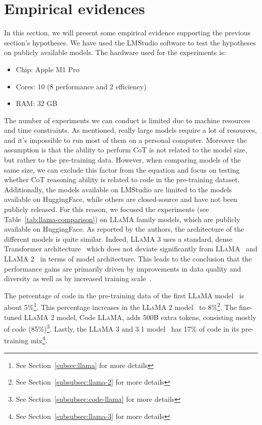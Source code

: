 \section{Empirical evidences}
\label{sec:empirical-evidence}

In this section, we will present some empirical evidence supporting the previous section's hypotheses.
We have used the LMStudio\cite{lmstudio} software to test the hypotheses on publicly available models.
The hardware used for the experiments is:
\begin{itemize}
	\item Chip: Apple M1 Pro
	\item Cores: 10 (8 performance and 2 efficiency)
	\item RAM: 32 GB
\end{itemize}

The number of experiments we can conduct is limited due to machine resources and time constraints.
As mentioned, really large models require a lot of resources, and it's impossible to run most of them on a personal computer.
Moreover the assumption is that the ability to perform CoT is not related to the model size, but rather to the pre-training data.
However, when comparing models of the same size, we can exclude this factor from the equation and focus on testing whether CoT reasoning ability is related to code in the pre-training dataset.
Additionally, the models available on LMStudio are limited to the models available on HuggingFace, while others are closed-source and have not been publicly released.
For this reason, we focused the experiments (see Table~\ref{tab:llama-comparison}) on \textsc{LLaMA} family models, which are publicly available on HuggingFace.
As reported by the authors, the architecture of the different models is quite similar.
Indeed, \textsc{LLaMA} 3 uses a standard, dense Transformer architecture~\cite{vaswani2023attention} which does not deviate significantly from \textsc{LLaMA}~\cite{touvron2023llama} and \textsc{LLaMA} 2~\cite{touvron2023llama2} in terms of model architecture.
This leads to the conclusion that the performance gains are primarily driven by improvements in data quality and diversity as well as by increased training scale~\cite{llama3}.

The percentage of code in the pre-training data of the first \textsc{LLaMA} model~\cite{touvron2023llama} is about 5\%\footnote{See Section~\ref{subsec:llama} for more details}.
This percentage increases in the \textsc{LLaMA} 2 model~\cite{touvron2023llama2} to 8\%\footnote{See Section~\ref{subsubsec:llama-2} for more details}.
The fine-tuned \textsc{LLaMA} 2 model, Code \textsc{LLaMA}\cite{roziere2024codellamaopenfoundation}, adds 500B extra tokens, consisting mostly of code (85\%)\footnote{See Section~\ref{subsubsec:code-llama} for more details}.
Lastly, the \textsc{LLaMA} 3 and 3.1 model~\cite{llama3} has 17\% of code in its pre-training mix\footnote{See Section~\ref{subsubsec:llama-3} for more details}.

